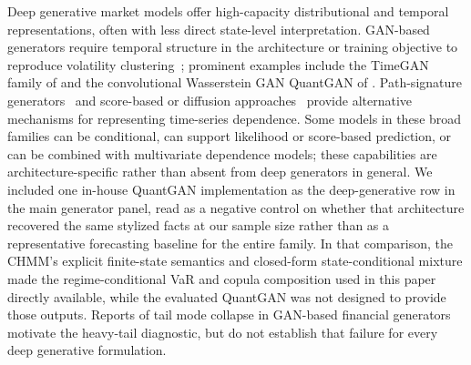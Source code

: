 Deep generative market models offer high-capacity distributional and temporal representations, often with less direct state-level interpretation. GAN-based generators require temporal structure in the architecture or training objective to reproduce volatility clustering~\cite{takahashi2019modeling, kwon2024can}; prominent examples include the TimeGAN family of \citet{yoon2019timegan} and the convolutional Wasserstein GAN QuantGAN of \citet{wiese2020quantgan}. Path-signature generators~\cite{chevyrev2016primer, ni2021sig, buehler2020data} and score-based or diffusion approaches~\cite{ho2020denoising, rasul2021autoregressive, tashiro2021csdi} provide alternative mechanisms for representing time-series dependence. Some models in these broad families can be conditional, can support likelihood or score-based prediction, or can be combined with multivariate dependence models; these capabilities are architecture-specific rather than absent from deep generators in general. We included one in-house QuantGAN implementation as the deep-generative row in the main generator panel, read as a negative control on whether that architecture recovered the same stylized facts at our sample size rather than as a representative forecasting baseline for the entire family. In that comparison, the CHMM's explicit finite-state semantics and closed-form state-conditional mixture made the regime-conditional VaR and copula composition used in this paper directly available, while the evaluated QuantGAN was not designed to provide those outputs. Reports of tail mode collapse in GAN-based financial generators~\cite{takahashi2019modeling, kwon2024can} motivate the heavy-tail diagnostic, but do not establish that failure for every deep generative formulation.

